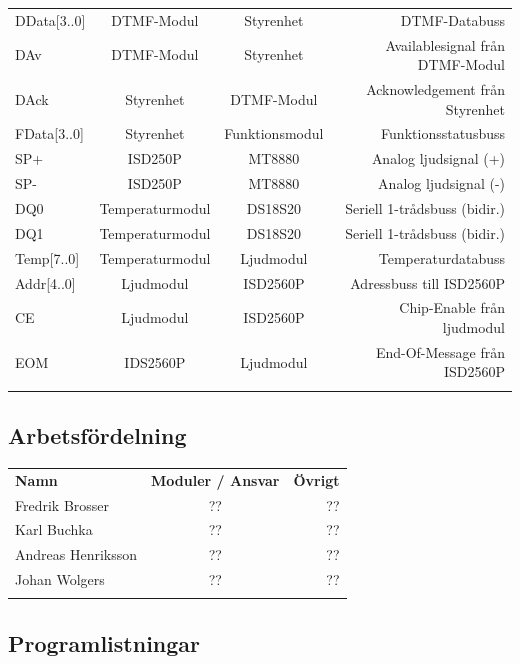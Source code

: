 \documentclass[a4paper,11pt]{article}
\begin{document}
\begin{tabular}{l c c r}
		DData[3..0] & DTMF-Modul & Styrenhet & DTMF-Databuss\\
		DAv & DTMF-Modul & Styrenhet & Availablesignal från DTMF-Modul\\
		DAck & Styrenhet & DTMF-Modul & Acknowledgement från Styrenhet\\

		FData[3..0] & Styrenhet & Funktionsmodul & Funktionsstatusbuss\\

		SP+ & ISD250P & MT8880 & Analog ljudsignal (+)\\
		SP- & ISD250P & MT8880 & Analog ljudsignal (-)\\

		DQ0 & Temperaturmodul & DS18S20 & Seriell 1-trådsbuss (bidir.)\\
		DQ1 & Temperaturmodul & DS18S20 & Seriell 1-trådsbuss (bidir.)\\

		Temp[7..0] & Temperaturmodul & Ljudmodul & Temperaturdatabuss\\

		Addr[4..0] & Ljudmodul & ISD2560P & Adressbuss till ISD2560P\\
		CE & Ljudmodul & ISD2560P & Chip-Enable från ljudmodul\\
		EOM & IDS2560P & Ljudmodul & End-Of-Message från ISD2560P\\\\
	\end{tabular}

	\subsection{Arbetsfördelning}

	\begin{tabular}{l c r}
		\\{\bf Namn} & {\bf Moduler / Ansvar} & {\bf Övrigt}\\
		Fredrik Brosser 	& ?? 	& ??\\
		Karl Buchka 		& ?? 	& ??\\
		Andreas Henriksson 	& ?? 	& ??\\
		Johan Wolgers 		& ??	& ??\\\\
	\end{tabular}

	\subsection{Programlistningar}
	
\end{document}
